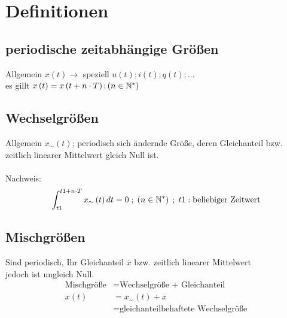 \section{Definitionen}

\subsection{periodische zeitabhängige Größen}
Allgemein \(x\left(t\right) \xrightarrow{}\) speziell \(u\left(t\right); i\left(t\right); q\left(t\right); \dots\) \\
es gillt \(x\left(t\right) = x\left(t + n \cdot T\right) ; \left(n \in \mathbb{N}^* \right) \)

\subsection{Wechselgrößen}
Allgemein \(x_{\sim} \left(t\right)\); periodisch sich ändernde Größe, deren Gleichanteil bzw. 
zeitlich linearer Mittelwert gleich Null ist. \\ \vspace{0mm} \\
Nachweis: \[\int_{t1}^{t1 + n \cdot T} x_{\sim} \left(t\right)dt = 0 \; ; \; \left(n \in \mathbb{N}^* \right) \;
; \; t1: \text{beliebiger Zeitwert}\]

\subsection{Mischgrößen}
Sind periodisch, Ihr Gleichanteil \(\overline{x}\) bzw. zeitlich linearer Mittelwert \\
jedoch ist ungleich Null. 
\begin{align*}
\text{Mischgröße} &= \text{Wechselgröße + Gleichanteil} \\
x\left(t\right) &= x_{\sim}\left(t\right) + \overline{x} \\
&= \text{gleichanteilbehaftete Wechselgröße}
\end{align*}
